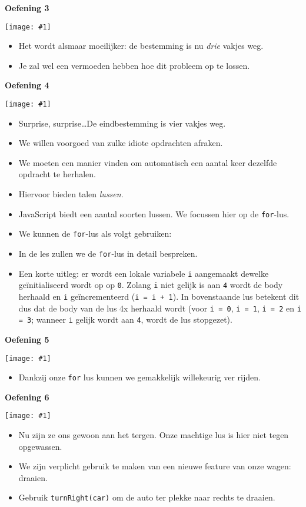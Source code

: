 \documentclass[a4paper]{article}
\newcommand{\newexercise}[1]{\clearpage\begin{center}\Huge\bf #1\end{center}}
\newcommand{\exercisemap}[1]{\begin{center}\texttt{[image: \#1]}\end{center}}
\newcommand{\code}[1]{
  \begin{center}
    \begin{minipage}{.8\linewidth}
      
    \end{minipage}
  \end{center}
}
\begin{document}
\newexercise{Oefening 3}
\exercisemap{ex3}

\begin{itemize}
  \item Het wordt alsmaar moeilijker: de bestemming is nu \emph{drie} vakjes weg.
  \item Je zal wel een vermoeden hebben hoe dit probleem op te lossen.
\end{itemize}



\newexercise{Oefening 4}
\exercisemap{ex4}

\begin{itemize}
  \item Surprise, surprise\dots De eindbestemming is vier vakjes weg.
  \item We willen voorgoed van zulke idiote opdrachten afraken.
  \item We moeten een manier vinden om automatisch een aantal keer
        dezelfde opdracht te herhalen.
  \item Hiervoor bieden talen \emph{lussen}.
  \item JavaScript biedt een aantal soorten lussen. We focussen hier op de \verb'for'-lus.
  \item We kunnen de \verb'for'-lus als volgt gebruiken:
        \code{for.js}
  \item In de les zullen we de \verb'for'-lus in detail bespreken.
  \item Een korte uitleg: er wordt een lokale variabele \verb'i' aangemaakt
        dewelke ge\"initialiseerd wordt op op \verb'0'.
        Zolang \verb'i' niet gelijk is aan \verb'4' wordt
        de body herhaald en \verb'i' ge\"incrementeerd (\verb'i = i + 1').
        In bovenstaande lus betekent dit dus dat de body
        van de lus 4x herhaald wordt (voor \verb'i = 0', \verb'i = 1',
        \verb'i = 2' en \verb'i = 3'; wanneer \verb'i' gelijk wordt aan \verb'4',
        wordt de lus stopgezet).
\end{itemize}


\newexercise{Oefening 5}
\exercisemap{ex5}

\begin{itemize}
  \item Dankzij onze \verb'for' lus kunnen we gemakkelijk willekeurig ver rijden.
\end{itemize}



\newexercise{Oefening 6}
\exercisemap{ex6}

\begin{itemize}
  \item Nu zijn ze ons gewoon aan het tergen. Onze machtige lus is hier niet tegen opgewassen.
  \item We zijn verplicht gebruik te maken van een nieuwe feature van onze wagen: draaien.
  \item Gebruik \verb'turnRight(car)' om de auto ter plekke naar rechts te draaien.
\end{itemize}
\end{document}
